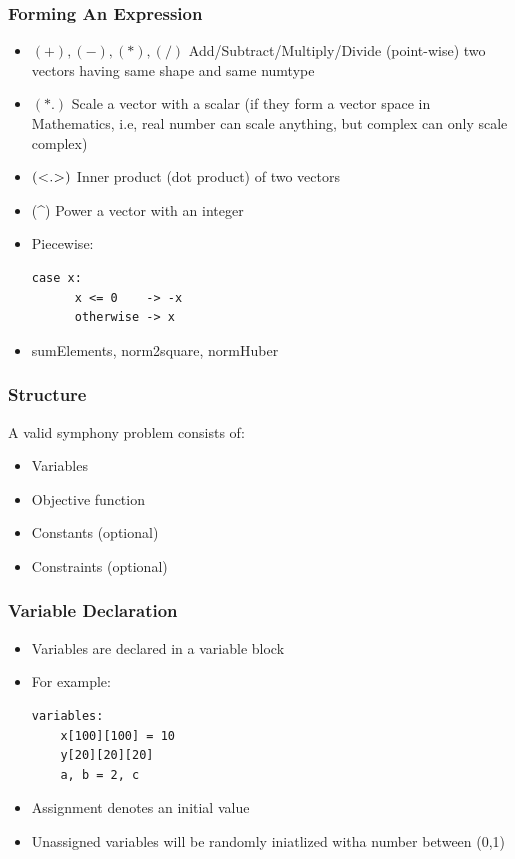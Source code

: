\documentclass[presentation]{beamer}
\begin{document}
\begin{frame}[fragile]
  \frametitle{Forming An Expression}

  \begin{itemize}
    \item $(+),(-),(*),(/)$ Add/Subtract/Multiply/Divide (point-wise) two vectors having same shape and same numtype
    \item $(*.)$ Scale a vector with a scalar (if they form a vector space in Mathematics, i.e, real number can scale anything, 
    but complex can only scale complex)
    \item $(\textsc{<.>})$ Inner product (dot product) of two vectors 
    \item (\^{}) Power a vector with an integer
    \item Piecewise:
    \begin{lstlisting}[style=Haskell]
    case x:
      x <= 0    -> -x
      otherwise -> x
    \end{lstlisting} 
    \item sumElements, norm2square, normHuber
  \end{itemize}
\end{frame}

\begin{frame}[fragile]
  \frametitle{Structure}
  A valid symphony problem consists of:
  \begin{itemize}
  \item Variables 
  \item Objective function 
  \item Constants (optional)
  \item Constraints (optional)
  \end{itemize}
\end{frame}

\begin{frame}[fragile]
  \frametitle{Variable Declaration}

  \begin{itemize}
  \item Variables are declared in a {\color{red} variable} block
  \item For example:
  \begin{lstlisting}[style=Haskell]
  variables:
    x[100][100] = 10
    y[20][20][20]
    a, b = 2, c
  \end{lstlisting}
  \item Assignment denotes an initial value
  \item Unassigned variables will be randomly iniatlized witha number between (0,1)
  \end{itemize}
\end{frame}
\end{document}
